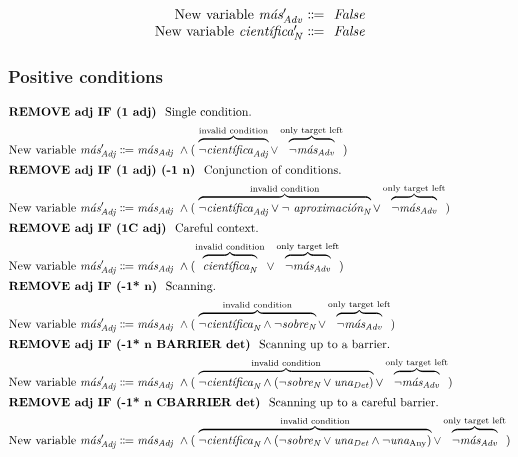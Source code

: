 \begin{equation}
\begin{array}{r @{~\eqdef~} l}
    \text{New variable } \mas{}'_\adv      & \text{ \em False} \\
    \text{New variable } \cientifica{}'_\n & \text{ \em False} \\
\end{array}
\label{eq:slAdjOrdered}
\end{equation}



\subsubsection{Positive conditions}

\def\invConds{\text{invalid condition}}
\def\onlyTrgLeft{\text{only target left}}

\begin{align}
%
\intertext{\cgrule{REMOVE adj IF (1 adj)} Single condition.} 
\text{New variable } \mas{}'_\adj 
      & \eqdef \masAdj\ 
        \wedge ( \; \ob{\neg\cientificaAdj}^{\invConds} 
        \vee  \ob{\neg\masAdv}^{\onlyTrgLeft} ) \\
%
%
\intertext{\cgrule{REMOVE adj IF (1 adj) (-1 n)} Conjunction of conditions.}
\text{New variable } \mas{}'_\adj 
      & \eqdef \masAdj\ 
       \wedge ( \; \ob{\neg\cientificaAdj \vee \neg\aproximacionN}^{\invConds} 
       \vee  \ob{\neg\masAdv}^{\onlyTrgLeft} ) \\
%
%
\intertext{\cgrule{REMOVE adj IF (1C adj)} Careful context.} %
  \text{New variable } \mas{}'_\adj 
     & \eqdef \masAdj\ 
     \wedge ( \ob{\cientificaN}^{\invConds} 
     \vee \ob{\neg\masAdv}^{\onlyTrgLeft}  ) \\
%
%
\intertext{\cgrule{REMOVE adj IF (-1* n)} Scanning.}
  \text{New variable } \mas{}'_\adj 
     & \eqdef \masAdj\ 
     \wedge ( \; \ob{\neg\cientificaN \wedge \neg\sobreN}^{\invConds} 
     \vee \ob{\neg\masAdv}^{\onlyTrgLeft} ) \\
%
%
\intertext{\cgrule{REMOVE adj IF (-1* n BARRIER det)} Scanning up to a barrier.}
  \text{New variable } \mas{}'_\adj 
     & \eqdef \masAdj\ 
     \wedge ( \; \ob{\neg\cientificaN \wedge (\neg\sobreN \vee \unaDet)}^{\invConds} 
     \vee \ob{\neg\masAdv}^{\onlyTrgLeft} )  \\
%
%
\intertext{\cgrule{REMOVE adj IF (-1* n CBARRIER det)} Scanning up to a careful barrier.}
  \text{New variable } \mas{}'_\adj 
     & \eqdef \masAdj\ 
     \wedge ( \; \ob{\neg\cientificaN \wedge (\neg\sobreN \vee \unaDet \wedge \neg\unaAny)}^{\invConds} 
     \vee \ob{\neg\masAdv}^{\onlyTrgLeft} ) 
\end{align}



